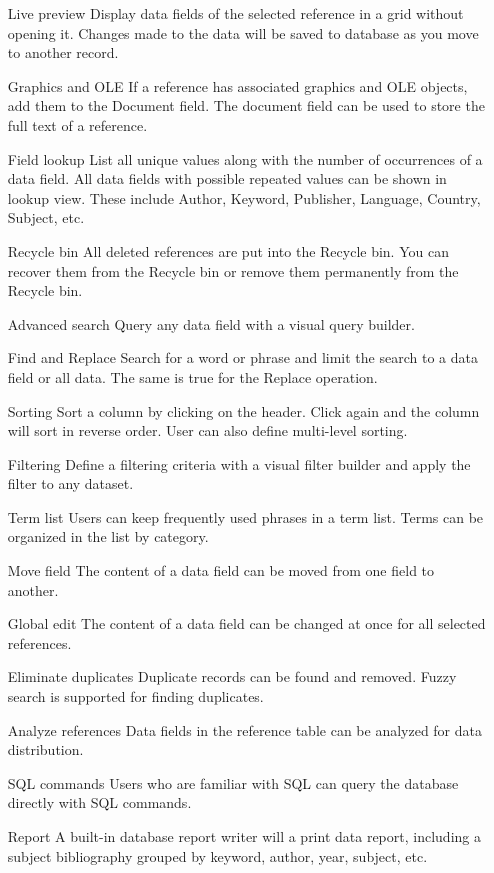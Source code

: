 \begin{itemize}
 \item[Live preview] Display data fields of the selected reference in a grid
 without opening it. Changes made to the data will be saved to
 database as you move to another record.

 \item[Graphics and OLE] If a reference has associated graphics and OLE
 objects, add them to the Document field. The document field can
 be used to store the full text of a reference.

 \item[Field lookup] List all unique values along with the number of
 occurrences of a data field. All data fields with possible repeated
 values can be shown in lookup view. These include Author,
 Keyword, Publisher, Language, Country, Subject, etc.

 \item[Recycle bin] All deleted references are put into the Recycle bin.
 You can recover them from the Recycle bin or remove them
 permanently from the Recycle bin.

 \item[Advanced search] Query any data field with a visual query builder.

 \item[Find and Replace] Search for a word or phrase and limit the search
 to a data field or all data. The same is true for the Replace
 operation.

 \item[Sorting] Sort a column by clicking on the header. Click again and
 the column will sort in reverse order. User can also define
 multi-level sorting.

 \item[Filtering] Define a filtering criteria with a visual filter builder and
 apply the filter to any dataset.

 \item[Term list] Users can keep frequently used phrases in a term list.
 Terms can be organized in the list by category.

 \item[Move field] The content of a data field can be moved from one
 field to another.

 \item[Global edit] The content of a data field can be changed at once
 for all selected references.

 \item[Eliminate duplicates] Duplicate records can be found and
 removed. Fuzzy search is supported for finding duplicates.

 \item[Analyze references] Data fields in the reference table can be
 analyzed for data distribution.

 \item[SQL commands] Users who are familiar with SQL can query the
 database directly with SQL commands.

 \item[Report] A built-in database report writer will a print data report,
 including a subject bibliography grouped by keyword, author, year,
 subject, etc.

\end{itemize}

